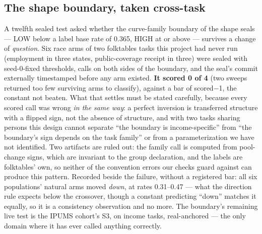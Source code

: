 \documentclass[conference]{IEEEtran}
\begin{document}
\subsection{The shape boundary, taken cross-task}
\label{sec:crosstask}

A twelfth sealed test asked whether the curve-family boundary of the shape seals --- LOW
below a label base rate of 0.365, HIGH at or above --- survives a change of
\emph{question}. Six race arms of two folktables tasks this project had never run
(employment in three states, public-coverage receipt in three) were sealed with
seed-0-fixed thresholds, calls on both sides of the boundary, and the seal's commit
externally timestamped before any arm existed. \textbf{It scored 0 of 4} (two sweeps
returned too few surviving arms to classify), against a bar of scored$-$1, the constant
not beaten. What that settles must be stated carefully, because every scored call was
wrong \emph{in the same way}: a perfect inversion is transferred structure with a
flipped sign, not the absence of structure, and with two tasks sharing persons this
design cannot separate ``the boundary is income-specific'' from ``the boundary's sign
depends on the task family'' or from a parameterization we have not identified. Two
artifacts are ruled out: the family call is computed from pool-change signs, which are
invariant to the group declaration, and the labels are folktables' own, so neither of
the convention errors our checks guard against can produce this pattern. Recorded
beside the failure, without a registered bar: all six populations' natural arms moved
\emph{down}, at rates 0.31--0.47 --- what the direction rule expects below the
crossover, though a constant predicting ``down'' matches it equally, so it is a
consistency observation and no more. The boundary's remaining live test is the IPUMS
cohort's S3, on income tasks, real-anchored --- the only domain where it has ever
called anything correctly.
\end{document}
